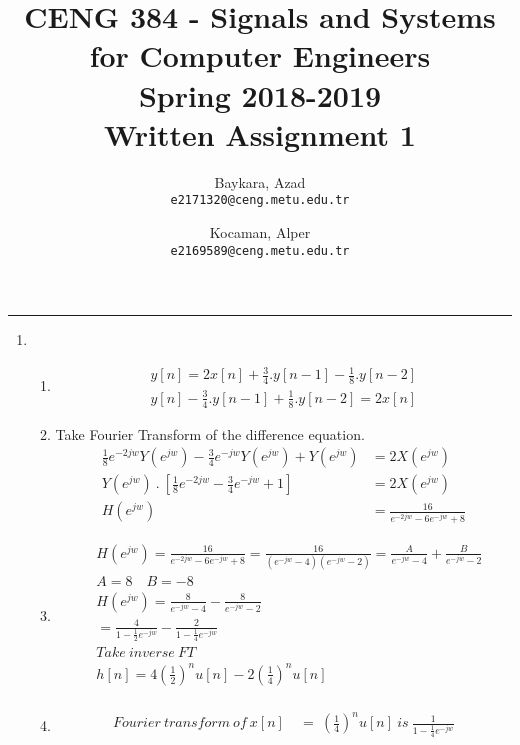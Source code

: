 \documentclass[10pt,a4paper, margin=1in]{article}
\author{
  Baykara, Azad \\
  \texttt{e2171320@ceng.metu.edu.tr}
  \and
  Kocaman, Alper \\
  \texttt{e2169589@ceng.metu.edu.tr}
}
\title{CENG 384 - Signals and Systems for Computer Engineers \\
Spring 2018-2019 \\
Written Assignment 1}
\begin{document}
\maketitle



\noindent\rule{19cm}{1.2pt}

\begin{enumerate}

\item 
    \begin{enumerate}
    \item %
    \begin{align*}
    y[n] = 2x[n] + \frac{3}{4}.y[n-1] - \frac{1}{8}.y[n-2] \\
    y[n] - \frac{3}{4}.y[n-1] + \frac{1}{8}.y[n-2] = 2x[n]
    \end{align*}
    \item %
    Take Fourier Transform of the difference equation. 
    \begin{align*}
    \frac{1}{8}e^{-2jw}Y(e^{jw}) -\frac{3}{4}e^{-jw}Y(e^{jw}) + Y(e^{jw}) &= 2X(e^{jw}) \\
    Y(e^{jw}) \ . \ [\frac{1}{8}e^{-2jw} - \frac{3}{4}e^{-jw} + 1] &= 2X(e^{jw}) \\
    H(e^{jw}) &= \frac{16}{e^{-2jw} -6e^{-jw} + 8} 
    \end{align*}
    \item %
    \begin{align*}
    &H(e^{jw}) = \frac{16}{e^{-2jw} -6e^{-jw} + 8} = \frac{16}{(e^{-jw }-4)(e^{-jw} - 2)} = \frac{A}{e^{-jw }-4} + \frac{B}{e^{-jw} - 2} \\
    &A = 8 \quad B=-8 \\
    &H(e^{jw}) = \frac{8}{e^{-jw }-4} - \frac{8}{e^{-jw} - 2} \\
    &= \frac{4}{1- \frac{1}{2} e^{-jw }} - \frac{2}{1- \frac{1}{4} e^{-jw}} \\
    &Take \ inverse \ FT  \\
    &h[n] = 4(\frac{1}{2})^nu[n] -2(\frac{1}{4})^nu[n] \\
    \end{align*}
    \item %
    \begin{align*}
    Fourier \ transform \ of \ x[n] \ &= \ (\frac{1}{4})^nu[n] \ is \ \frac{1}{1-\frac{1}{4}e^{-jw}}  \\ 

\end{align*}
\end{enumerate}
\end{enumerate}
\end{document}
